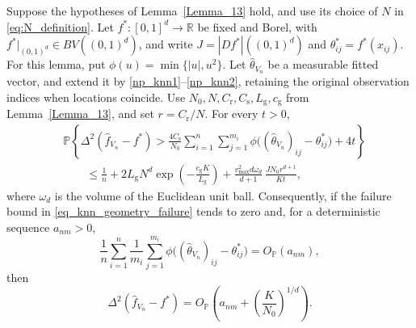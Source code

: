 \documentclass[twoside,11pt]{article}
\newenvironment{revision}{\color{revisionred}}{}
\begin{document}
\begin{revision}
\begin{lemma}
\label{knn_f}
Suppose the hypotheses of Lemma~\ref{Lemma_13} hold, and use its
choice of $N$ in \eqref{eq:N_definition}.
Let $f^*:[0,1]^d\to\mathbb R$ be fixed and Borel, with
$f^*|_{(0,1)^d}\in BV((0,1)^d)$, and write
$J=|Df^*|((0,1)^d)$ and $\theta^*_{ij}=f^*(x_{ij})$.
For this lemma, put $\phi(u)=\min\{|u|,u^2\}$.
Let $\hat\theta_{V_n}$ be a measurable fitted vector, and extend it by
\eqref{np_knn1}--\eqref{np_knn2}, retaining the original observation
indices when locations coincide.
Use $N_0,N,C_{\mathrm r},C_{\mathrm s},L_{\mathrm g},c_{\mathrm g}$
from Lemma~\ref{Lemma_13}, and set $r=C_{\mathrm r}/N$.
For every $t>0$,
\begin{equation}
\label{eq_knn_extension_tail}
\begin{aligned}
&\mathbb P\left\{
\Delta^2(\hat f_{V_n}-f^*)>
\frac{4C_{\mathrm s}}{N_0}\sum_{i=1}^n\sum_{j=1}^{m_i}
\phi\bigl((\hat\theta_{V_n})_{ij}-\theta^*_{ij}\bigr)+4t
\right\}
\\
&\qquad\leq
\frac1n+2L_{\mathrm g}N^d
\exp\left(-\frac{c_{\mathrm g}K}{L_{\mathrm g}}\right)
+\frac{v_{\max}^2d\omega_d}{d+1}\,
\frac{J N_0 r^{d+1}}{Kt},
\end{aligned}
\end{equation}
where $\omega_d$ is the volume of the Euclidean unit ball.
Consequently, if the failure bound in
\eqref{eq_knn_geometry_failure} tends to zero and, for a
deterministic sequence $a_{nm}>0$,
\[
\frac1n\sum_{i=1}^n\frac1{m_i}\sum_{j=1}^{m_i}
\phi\bigl((\hat\theta_{V_n})_{ij}-\theta^*_{ij}\bigr)
=O_{\mathbb P}(a_{nm}),
\]
then
\begin{equation}
\label{eq_knn_extension_rate}
\Delta^2(\hat f_{V_n}-f^*)
=O_{\mathbb P}\left(
a_{nm}+\left(\frac{K}{N_0}\right)^{1/d}
\right).
\end{equation}
\end{lemma}


\end{revision}
\end{document}
